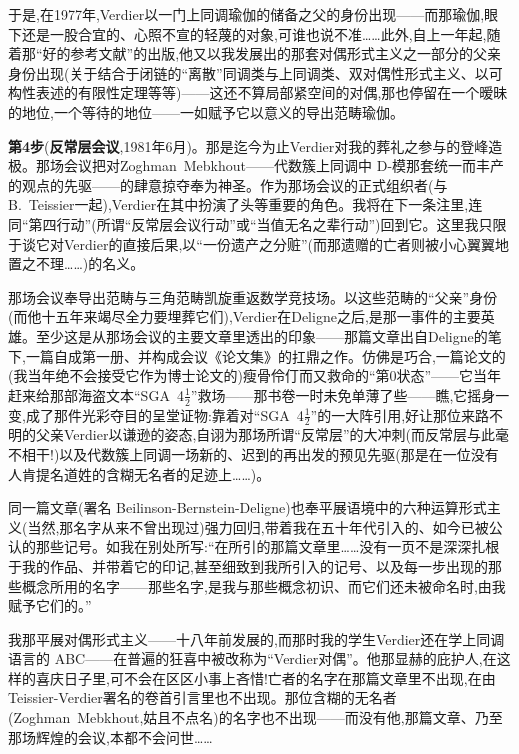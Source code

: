 \dmark{}于是,在1977年,Verdier以一门上同调瑜伽的储备之父的身份出现——而那瑜伽,眼下还是一股合宜的、心照不宣的轻蔑的对象,可谁也说不准……此外,自上一年起,随着那“好的参考文献”的出版,他又以我发展出的那套对偶形式主义之一部分的父亲身份出现(关于结合于闭链的“离散”同调类与上同调类、双对偶性形式主义、以可构性表述的有限性定理等等)——这还不算局部紧空间的对偶,那也停留在一个暧昧的地位,一个等待的地位——一如赋予它以意义的导出范畴瑜伽。

\textbf{第4步}(\textbf{反常层会议},1981年6月)。那是迄今为止Verdier对我的葬礼之参与的登峰造极。那场会议把对Zoghman~Mebkhout——代数簇上同调中 D-模那套统一而丰产的观点的先驱——的肆意掠夺奉为神圣。作为那场会议的正式组织者(与 B.~Teissier一起),Verdier在其中扮演了头等重要的角色。我将在下一条注里,连同“第四行动”(所谓“反常层会议行动”或“当值无名之辈行动”)回到它。这里我只限于谈它对Verdier的直接后果,以“一份遗产之分赃”(而那遗赠的亡者则被小心翼翼地置之不理……)的名义。

那场会议奉导出范畴与三角范畴凯旋重返数学竞技场。以这些范畴的“父亲”身份(而他十五年来竭尽全力要埋葬它们),Verdier在Deligne之后,是那一事件的主要英雄。至少这是从那场会议的主要文章里透出的印象——那篇文章出自Deligne的笔下,一篇自成第一册、并构成会议《论文集》的扛鼎之作。仿佛是巧合,一篇论文的(我当年绝不会接受它作为博士论文的)瘦骨伶仃而又救命的“第0状态”——它当年赶来给那部海盗文本“SGA~4$\frac{1}{2}$”救场——那书卷\dmark{}一时未免单薄了些——瞧,它摇身一变,成了那件光彩夺目的呈堂证物:靠着对“SGA~4$\frac{1}{2}$”的一大阵引用,好让那位来路不明的父亲Verdier以谦逊的姿态,自诩为那场所谓“反常层”的大冲刺(而反常层与此毫不相干!)以及代数簇上同调一场新的、迟到的再出发的预见先驱(那是在一位没有人肯提名道姓的含糊无名者的足迹上……)。

同一篇文章(署名 Beilinson-Bernstein-Deligne)也奉平展语境中的六种运算形式主义(当然,那名字从来不曾出现过)强力回归,带着我在五十年代引入的、如今已被公认的那些记号。如我在别处所写:“在所引的那篇文章里……没有一页不是深深扎根于我的作品、并带着它的印记,甚至细致到我所引入的记号、以及每一步出现的那些概念所用的名字——那些名字,是我与那些概念初识、而它们还未被命名时,由我赋予它们的。”

我那平展对偶形式主义——十八年前发展的,而那时我的学生Verdier还在学上同调语言的 ABC——在普遍的狂喜中被改称为“Verdier对偶”。他那显赫的庇护人,在这样的喜庆日子里,可不会在区区小事上吝惜!亡者的名字在那篇文章里不出现,在由Teissier-Verdier署名的卷首引言里也不出现。那位含糊的无名者(Zoghman~Mebkhout,姑且不点名)的名字也不出现——而没有他,那篇文章、乃至那场辉煌的会议,本都不会问世……


